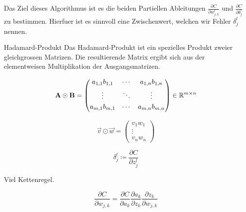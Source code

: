 \documentclass[../main]{subfiles}
\begin{document}
Das Ziel dieses Algorithmus ist es die beiden Partiellen Ableitungen
$\frac{\partial C}{\partial w_{j,k}^l}$ und $\frac{\partial C}{\partial b_j^l}$
zu bestimmen. Hierfuer ist es sinnvoll eine Zwischenwert, welchen wir Fehler
$\delta_j^l$ nennen.

\par\medskip
\begin{defbox}{Hadamard-Produkt}
  Das Hadamard-Produkt ist ein spezielles Produkt zweier gleichgrossen Matrizen.
  Die resultierende Matrix ergibt sich aus der elementweisen Multiplikation der Ausgangsmatrizen.

  \begin{minipage}{0.5\textwidth}
    \begin{equation*}
      \mathbf{A} \odot \mathbf{B} =
      \begin{pmatrix}
        a_{1,1} b_{1,1} & \cdots & a_{1,n} b_{1,n} \\[0.3em]
        \vdots & \ddots & \vdots \\[0.3em]
        a_{m,1} b_{m,1} & \cdots & a_{m,n} b_{m,n} \\[0.3em]
      \end{pmatrix}
      \in \mathbb{R}^{m \times n}
    \end{equation*}
  \end{minipage}
  \begin{minipage}{0.5\textwidth}
    \begin{equation*}
      \vec{v} \odot \vec{w} =
      \begin{pmatrix}
        v_1 w_1 \\
        \vdots \\
        v_n w_n
      \end{pmatrix}
    \end{equation*}

  \end{minipage}
\end{defbox}
\par\medskip

\begin{equation}
  \delta_j^l \coloneqq \frac{\partial C}{\partial z_j^l}
\end{equation}

Viel Kettenregel.

\begin{equation}
  \frac{\partial C}{\partial w_{j,k}} = \frac{\partial C}{\partial a_k} \frac{\partial a_k}{\partial z_k} \frac{\partial z_k}{\partial w_{j,k}}
\end{equation}
\end{document}
